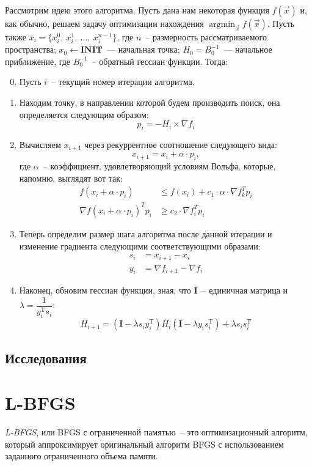 \documentclass[12pt, a4paper, oneside, final]{article}
\begin{document}
	Рассмотрим идею этого алгоритма.
	Пусть дана нам некоторая функция $f(\vec{x})$ и, как обычно, решаем задачу оптимизации нахождения $\operatorname*{argmin}_{\vec{x}}{f(\vec{x})}$.
	Пусть также $x_{i} = \{x_{i}^{0}, ~ x_{i}^{1}, ~ \ldots, ~ x_{i}^{n - 1}\}$, где $n$~-- размерность рассматриваемого пространства; $x_{0} \gets \textbf{INIT}$~--- начальная точка; $H_{0} = B_{0}^{-1}$~--- начальное приближение, где $B_{0}^{-1}$~-- обратный гессиан функции.
	Тогда:
	\begin{enumerate}[1)]
		\setcounter{enumi}{-1}
		\item Пусть $i$~-- текущий номер итерации алгоритма.
		\item Находим точку, в направлении которой будем производить поиск, она определяется следующим образом:
		\[
			p_{i} = -H_{i} \times \nabla{f_{i}}
		\]
		\item Вычисляем $x_{i + 1}$ через рекуррентное соотношение следующего вида:
		\[
			x_{i + 1} = x_{i} + \alpha \cdot p_{i},
		\] где $\alpha$~-- коэффициент, удовлетворяющий условиям Вольфа, которые, напомню, выглядят вот так:
		\begin{align*}
			f(x_{i} + \alpha \cdot p_{i}) &\leqslant f(x_{i}) + c_{1} \cdot \alpha \cdot \nabla{f^{T}_{k}p_{i}} \\
			\nabla{f(x_{i} + \alpha \cdot p_{i})^{T}p_{i}} &\geqslant c_{2} \cdot \nabla{f^{T}_{i}p_{i}}
		\end{align*}
		\item Теперь определим размер шага алгоритма после данной итерации и изменение градиента следующими соответствующими образами:
		\begin{align*}
			s_{i} &= x_{i + 1} - x_{i} \\
			y_{i} &= \nabla{f_{i + 1}} - \nabla{f_{i}}
		\end{align*}
		\item Наконец, обновим гессиан функции, зная, что $\mathbf{I}$~-- единичная матрица и $\lambda = \dfrac{1}{y_{i}^{\mathrm{T}}s_{i}}$:
		\[
			H_{i + 1} = \left(\mathbf{I} - \lambda s_{i}y_{i}^{\mathrm{T}}\right)H_{i}\left(\mathbf{I} - \lambda y_{i} s_{i}^{\mathrm{T}}\right) + \lambda s_{i} s_{i}^{\mathrm{T}}
		\]
	\end{enumerate}
	\subsection*{Исследования}
	\newpage
	\section*{L-BFGS}
	\textit{L-BFGS}, или BFGS с ограниченной памятью~-- это оптимизационный алгоритм, который аппроксимирует оригинальный алгоритм BFGS с использованием заданного ограниченного объема памяти.
\end{document}
